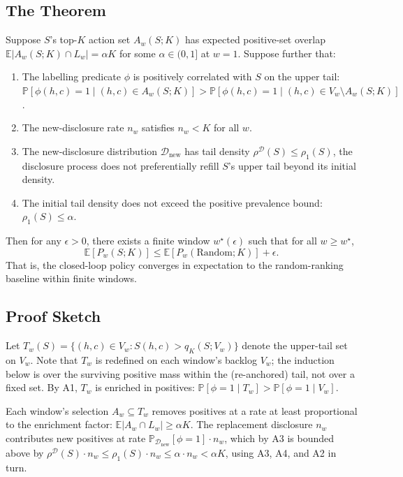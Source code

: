 \subsection{The Theorem}

\begin{theorem}
\label{thm:exhaustion}
Suppose $S$'s top-$K$ action set $A_w(S; K)$ has expected positive-set
overlap $\mathbb{E}|A_w(S; K) \cap L_w| = \alpha K$ for some
$\alpha \in (0, 1]$ at $w = 1$. Suppose further that:
\begin{enumerate}
\item[(A1)] The labelling predicate $\phi$ is positively correlated
with $S$ on the upper tail: $\mathbb{P}[\phi(h, c) = 1 \mid (h, c) \in
A_w(S; K)] > \mathbb{P}[\phi(h, c) = 1 \mid (h, c) \in V_w \setminus A_w(S; K)]$.
\item[(A2)] The new-disclosure rate $n_w$ satisfies $n_w < K$ for all $w$.
\item[(A3)] The new-disclosure distribution $\mathcal{D}_{\text{new}}$
has tail density $\rho^{\mathcal{D}}(S) \leq \rho_1(S)$, 
the disclosure process does not preferentially refill $S$'s upper
tail beyond its initial density.
\item[(A4)] The initial tail density does not exceed the positive
prevalence bound: $\rho_1(S) \leq \alpha$.
\end{enumerate}
Then for any $\epsilon > 0$, there exists a finite window
$w^\star(\epsilon)$ such that for all $w \geq w^\star$,
\begin{equation}
\mathbb{E}[P_w(S; K)] \leq \mathbb{E}[P_w(\mathrm{Random}; K)] + \epsilon.
\end{equation}
That is, the closed-loop policy converges in expectation to the random-ranking
baseline within finite windows.
\end{theorem}

\subsection{Proof Sketch}

Let $T_w(S) = \{(h, c) \in V_w : S(h, c) > q_K(S; V_w)\}$ denote the
upper-tail set on $V_w$. Note that $T_w$ is redefined on each
window's backlog $V_w$; the induction below is over the surviving
positive mass within the (re-anchored) tail, not over a fixed set.
By A1, $T_w$ is enriched in positives:
$\mathbb{P}[\phi = 1 \mid T_w] > \mathbb{P}[\phi = 1 \mid V_w]$.

Each window's selection $A_w \subseteq T_w$ removes positives at a
rate at least proportional to the enrichment factor:
$\mathbb{E}|A_w \cap L_w| \geq \alpha K$. The replacement disclosure
$n_w$ contributes new positives at rate
$\mathbb{P}_{\mathcal{D}_{\text{new}}}[\phi = 1] \cdot n_w$, which
by A3 is bounded above by $\rho^{\mathcal{D}}(S) \cdot n_w
\leq \rho_1(S) \cdot n_w \leq \alpha \cdot n_w < \alpha K$,
using A3, A4, and A2 in turn.

